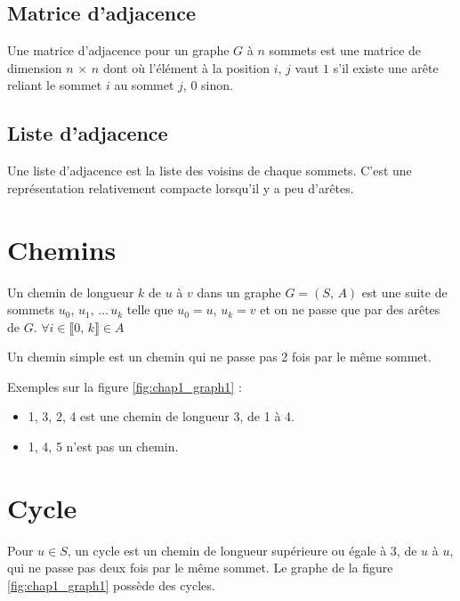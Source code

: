 \subsection{Matrice d'adjacence}
Une matrice d'adjacence pour un graphe $G$ à $n$ sommets est une matrice de dimension $n \,\times\, n$ dont où l'élément à la position $i,\,j$ vaut $1$ s'il existe une arête reliant le sommet $i$ au sommet $j$, $0$ sinon.

\subsection{Liste d'adjacence}
Une liste d'adjacence est la liste des voisins de chaque sommets. C'est une représentation relativement compacte lorsqu'il y a peu d'arêtes.

\section{Chemins}
\begin{definition}[Chemin]
Un chemin de longueur $k$ de $u$ à $v$ dans un graphe $G = (S,\, A)$ est une suite de sommets $u_{0},\, u_{1},\, ...\, u_{k}$ telle que $u_{0} = u$, $u_{k} = v$ et on ne passe que par des arêtes de $G$. $\forall i \in \llbracket 0,\, k \rrbracket \in A$
\end{definition}

\begin{definition}
Un chemin simple est un chemin qui ne passe pas 2 fois par le même sommet.
\end{definition}

Exemples sur la figure \ref{fig:chap1_graph1} :
\begin{itemize}
\item 1, 3, 2, 4 est une chemin de longueur 3, de 1 à 4.
\item 1, 4, 5 n'est pas un chemin.
\end{itemize}

\section{Cycle}
\begin{definition}[Cycles]
Pour $u \in S$, un cycle est un chemin de longueur supérieure ou égale à 3, de $u$ à $u$, qui ne passe pas deux fois par le même sommet. Le graphe de la figure \ref{fig:chap1_graph1} possède des cycles.
\end{definition}

